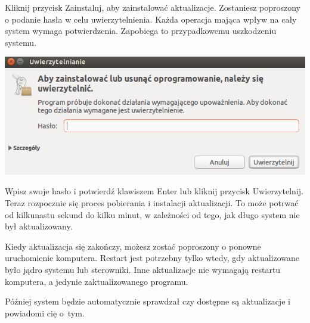 Kliknij przycisk \textcolor{ubuntu_orange}{Zainstaluj}, aby zainstalować aktualizacje. Zostaniesz poproszony o podanie hasła w celu uwierzytelnienia. Każda operacja mająca wpływ na cały system wymaga potwierdzenia. Zapobiega to przypadkowemu uszkodzeniu systemu.

\begin{center}
	\includegraphics[width=\linewidth]{images/unity_uwierzytelnienie.png}
\end{center}

Wpisz swoje hasło i potwierdź klawiszem Enter lub kliknij przycisk \textcolor{ubuntu_orange}{Uwierzytelnij}. Teraz rozpocznie się proces pobierania i instalacji aktualizacji. To może potrwać od kilkunastu sekund do kilku minut, w zależności od tego, jak długo system nie był aktualizowany.

Kiedy aktualizacja się zakończy, możesz zostać poproszony o ponowne uruchomienie komputera. Restart jest potrzebny tylko wtedy, gdy aktualizowane było jądro systemu lub sterowniki. Inne aktualizacje nie wymagają restartu komputera, a jedynie zaktualizowanego programu.

Później system będzie automatycznie sprawdzał czy dostępne są aktualizacje i powiadomi cię o~tym.
\clearpage
